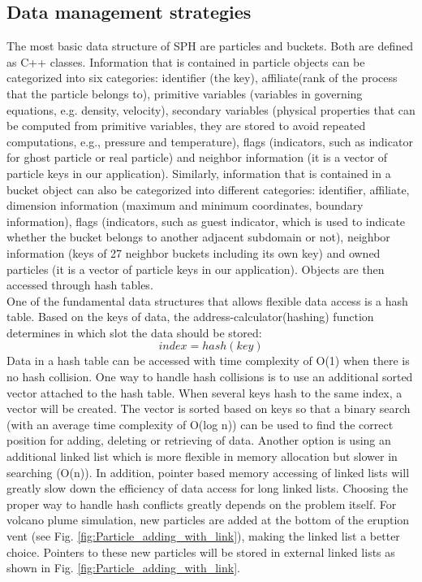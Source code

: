 \documentclass[procedia]{easychair}
\begin{document}
\subsection{Data management strategies}
The most basic data structure of SPH are particles and buckets. Both are defined as C++ classes. Information that is contained in particle objects can be categorized into six categories: identifier (the key), affiliate(rank of the process that the particle belongs to), primitive variables (variables in governing equations, e.g. density, velocity), secondary variables (physical properties that can be computed from primitive variables, they are stored to avoid repeated computations, e.g., pressure and temperature), flags (indicators, such as indicator for ghost particle or real particle) and neighbor information (it is a vector of particle keys in our application). Similarly,  information that is contained in a bucket object can also be categorized into different categories: identifier, affiliate, dimension information (maximum and minimum coordinates, boundary information), flags (indicators, such as guest indicator, which is used  to indicate whether the bucket belongs to another adjacent subdomain or not), neighbor information (keys of 27 neighbor buckets including its own key) and owned particles (it is a vector of particle keys in our application). Objects are then accessed through hash tables.\\
One of the fundamental data structures that allows flexible data access is a hash table. Based on the keys of data, the address-calculator(hashing) function determines in which slot the data should be stored:
\begin{equation}
index = hash(key)
\end{equation}
Data in a hash table can be accessed with time complexity of O(1) when there is no hash collision. One way to handle hash collisions is to use an additional sorted vector attached to the hash table. When several keys hash to the same index, a vector will be created. The vector is sorted based on keys so that a binary search (with an average time complexity of O(log n)) can be used to find the correct position for adding, deleting or retrieving of data. Another option is using an additional linked list which is more flexible in memory allocation but slower in searching (O(n)). In addition, pointer based memory accessing of linked lists will greatly slow down the efficiency of data access for long linked lists. Choosing the proper way to handle hash conflicts greatly depends on the problem itself. For volcano plume simulation, new particles are added at the bottom of the eruption vent (see Fig. \ref{fig:Particle_adding_with_link}), making the linked list a better choice. Pointers to these new particles will be stored in external linked lists as shown in Fig. \ref{fig:Particle_adding_with_link}.
\end{document}
